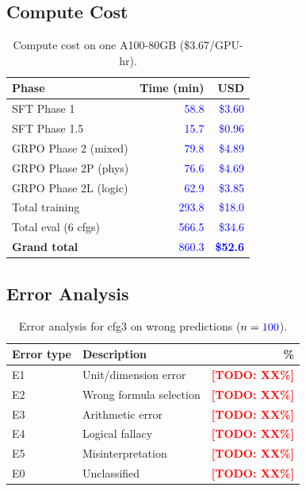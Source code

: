 \documentclass{ieeeaccess}
\newcommand{\todo}[1]{\textcolor{red}{\textbf{[TODO: #1]}}}
\newcommand{\fill}[1]{\textcolor{blue}{#1}}  %
\begin{document}
\subsection{Compute Cost}

\begin{table}[t]
  \centering
  \caption{Compute cost on one A100-80GB (\$3.67/GPU-hr).}
  \label{tab:compute}
  \begin{tabular}{lrr}
    \toprule
    \textbf{Phase} & \textbf{Time (min)} & \textbf{USD} \\
    \midrule
    SFT Phase 1          & \fill{58.8} & \fill{\$3.60} \\
    SFT Phase 1.5        & \fill{15.7} & \fill{\$0.96} \\
    GRPO Phase 2 (mixed) & \fill{79.8} & \fill{\$4.89} \\
    GRPO Phase 2P (phys) & \fill{76.6} & \fill{\$4.69} \\
    GRPO Phase 2L (logic)& \fill{62.9} & \fill{\$3.85} \\
    \midrule
    Total training       & \fill{293.8} & \fill{\$18.0} \\
    Total eval (6 cfgs)  & \fill{566.5} & \fill{\$34.6} \\
    \midrule
    \textbf{Grand total} & \fill{860.3} & \textbf{\fill{\$52.6}} \\
    \bottomrule
  \end{tabular}
\end{table}

\subsection{Error Analysis}

\begin{table}[t]
  \centering
  \caption{Error analysis for cfg3 on wrong predictions ($n=\fill{100}$).}
  \label{tab:errors}
  \begin{tabular}{llr}
    \toprule
    \textbf{Error type} & \textbf{Description} & \textbf{\%} \\
    \midrule
    E1 & Unit/dimension error    & \todo{XX\%} \\
    E2 & Wrong formula selection & \todo{XX\%} \\
    E3 & Arithmetic error        & \todo{XX\%} \\
    E4 & Logical fallacy         & \todo{XX\%} \\
    E5 & Misinterpretation       & \todo{XX\%} \\
    E0 & Unclassified            & \todo{XX\%} \\
    \bottomrule
  \end{tabular}
\end{table}
\end{document}
